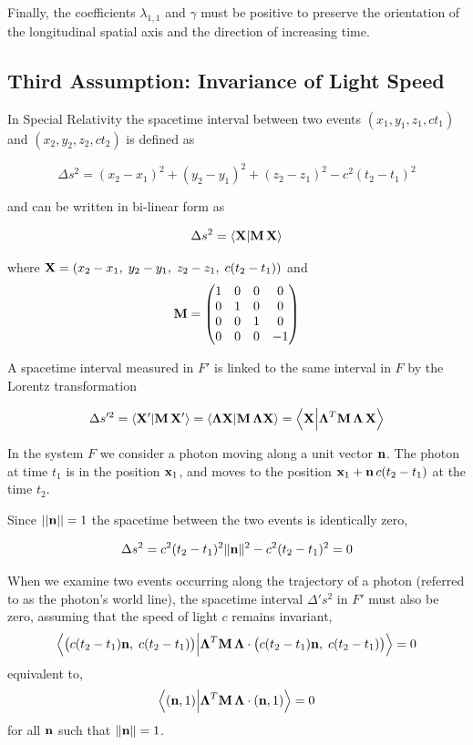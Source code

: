 \documentclass[12pt]{article}
\begin{document}
Finally, the coefficients $\lambda_{1,1}$ and $\gamma$ must be positive
to preserve the orientation of the longitudinal spatial axis and the direction of increasing time.

\subsection{Third Assumption: Invariance of Light Speed}

In Special Relativity the spacetime interval between two events $(x_1, y_1, z_1, ct_1)$ and
$(x_2, y_2, z_2, ct_2)$ is defined as

\[
  \Delta s^2 = (x_2 - x_1)^2 + (y_2 - y_1)^2 + (z_2 - z_1)^2 - c^2(t_2 - t_1)^2
\]

and can be written in bi-linear form as

\[
  \Delta s^2 = \ip{\vb{X}}{\vb{M}\,\vb{X}}
\]

where $\vb{X} = (x_2 - x_1,\; y_2 - y_1,\; z_2 - z_1,\; c(t_2 - t_1))$ and
\[
  \vb{M} =
  \begin{pmatrix}
    1 & 0 & 0 &  0 \\
    0 & 1 & 0 &  0 \\
    0 & 0 & 1 &  0 \\
    0 & 0 & 0 & -1
  \end{pmatrix}
\]

A spacetime interval measured in $F'$ is linked to the same interval in $F$ by the Lorentz
transformation

\[
  \Delta s'^2
  = \ip{\vb{X}'}{\vb{M}\,\vb{X}'}
  = \ip{\boldsymbol{\Lambda}\vb{X}}{\vb{M}\,\boldsymbol{\Lambda}\vb{X}}
  = \ip{\vb{X}}{\boldsymbol{\Lambda}^T\vb{M}\,\boldsymbol{\Lambda}\,\vb{X}}
\]

In the system $F$ we consider a photon moving along a unit vector $\vb{n}$. The photon at
time $t_1$ is in the position $\vb{x}_1$, and moves to the position
$\vb{x}_1 + \vb{n}\,c(t_2 - t_1)$ at the time $t_2$. 

Since $||\vb n||=1$ the spacetime between the two events is identically zero,

\[
  \Delta s^2 = c^2(t_2 - t_1)^2\|\vb{n}\|^2 - c^2(t_2 - t_1)^2 = 0
\]


When we examine two events occurring along the trajectory of a photon (referred to as the
photon's world line), the spacetime interval $\Delta' s^2$ in $F'$ must also be zero, assuming
that the speed of light $c$ remains invariant,
\[
  \ip{
    \bigl(c(t_2-t_1)\vb{n},\; c(t_2-t_1)\bigr)
  }{
    \boldsymbol{\Lambda}^T\vb{M}\,\boldsymbol{\Lambda}
    \cdot\bigl(c(t_2-t_1)\vb{n},\; c(t_2-t_1)\bigr)
  } = 0
\]
equivalent to,
\begin{equation}
  \ip{(\vb{n},1)}{\boldsymbol{\Lambda}^T\vb{M}\,\boldsymbol{\Lambda}\cdot(\vb{n},1)}
  = 0
  \label{eq:invariance_light_speed}
\end{equation}
for all $\vb{n}$ such that $\|\vb{n}\| = 1$.
\end{document}
